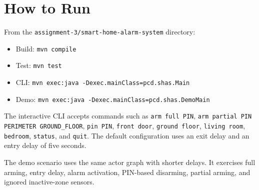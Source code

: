 \section{How to Run}

From the \texttt{assignment-3/smart-home-alarm-system} directory:

\begin{itemize}
  \item Build: \texttt{mvn compile}
  \item Test: \texttt{mvn test}
  \item CLI: \texttt{mvn exec:java -Dexec.mainClass=pcd.shas.Main}
  \item Demo: \texttt{mvn exec:java -Dexec.mainClass=pcd.shas.DemoMain}
\end{itemize}

The interactive CLI accepts commands such as \texttt{arm full PIN}, \texttt{arm partial PIN PERIMETER GROUND\_FLOOR},
\texttt{pin PIN}, \texttt{front door}, \texttt{ground floor}, \texttt{living room}, \texttt{bedroom},
\texttt{status}, and \texttt{quit}.
The default configuration uses an exit delay and an entry delay of five seconds.

The demo scenario uses the same actor graph with shorter delays.
It exercises full arming, entry delay, alarm activation, PIN-based disarming, partial arming, and ignored inactive-zone
sensors.
